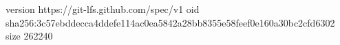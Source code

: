 version https://git-lfs.github.com/spec/v1
oid sha256:3c57ebddecca4ddefe114ac0ea5842a28bb8355e58feef0e160a30bc2cfd6302
size 262240
